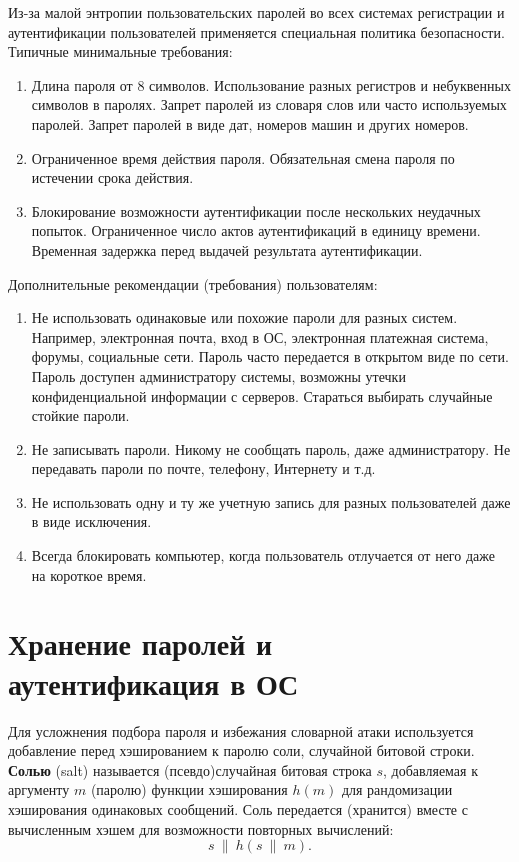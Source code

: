 \documentclass[10pt,a4paper]{book}
\begin{document}
Из-за малой энтропии пользовательских паролей во всех системах регистрации и аутентификации пользователей применяется специальная политика безопасности. Типичные минимальные требования:
\begin{enumerate}
    \item Длина пароля от 8 символов. Использование разных регистров и небуквенных символов в паролях. Запрет паролей из словаря слов или часто используемых паролей. Запрет паролей в виде дат, номеров машин и других номеров.
    \item Ограниченное время действия пароля. Обязательная смена пароля по истечении срока действия.
    \item Блокирование возможности аутентификации после нескольких неудачных попыток. Ограниченное число актов аутентификаций в единицу времени. Временная задержка перед выдачей результата аутентификации.
\end{enumerate}

Дополнительные рекомендации (требования) пользователям:
\begin{enumerate}
    \item Не использовать одинаковые или похожие пароли для разных систем. Например, электронная почта, вход в ОС, электронная платежная система, форумы, социальные сети. Пароль часто передается в открытом виде по сети. Пароль доступен администратору системы, возможны утечки конфиденциальной информации с серверов. Стараться выбирать случайные стойкие пароли.
    \item Не записывать пароли. Никому не сообщать пароль, даже администратору. Не передавать пароли по почте, телефону, Интернету и т.д.
    \item Не использовать одну и ту же учетную запись для разных пользователей даже в виде исключения.
    \item Всегда блокировать компьютер, когда пользователь отлучается от него даже на короткое время.
\end{enumerate}


\section[Хранение паролей и аутентификация в ОС]{Хранение паролей и \protect\\ аутентификация в ОС}

Для усложнения подбора пароля и избежания словарной атаки используется добавление перед хэшированием к паролю соли, случайной битовой строки. \textbf{Солью} (salt) называется (псевдо)случайная битовая строка $s$, добавляемая к аргументу $m$ (паролю) функции хэширования $h(m)$ для рандомизации хэширования одинаковых сообщений. Соль передается (хранится) вместе с вычисленным хэшем для возможности повторных вычислений:
    \[ s ~\|~ h(s ~\|~ m). \]
\end{document}
